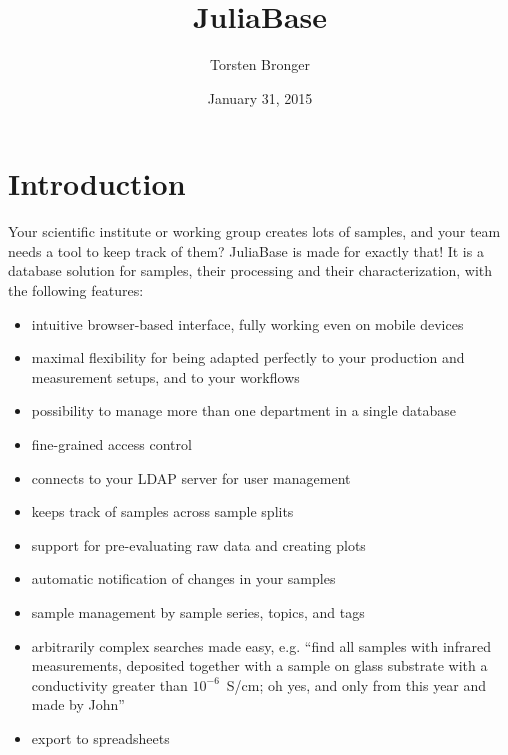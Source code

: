 \documentclass[a4paper,11pt,english]{sphinxmanual}
\title{JuliaBase}
\date{January 31, 2015}
\author{Torsten Bronger}
\begin{document}
\maketitle
\tableofcontents
{}\label{toc::doc}



\chapter{Introduction}
\label{index:introduction}\label{index::doc}\label{index:juliabase}
Your scientific institute or working group creates lots of samples, and your
team needs a tool to keep track of them?  JuliaBase is made for exactly that!
It is a database solution for samples, their processing and their
characterization, with the following features:
\begin{itemize}
\item {} 
intuitive browser-based interface, fully working even on mobile devices

\item {} 
maximal flexibility for being adapted perfectly to your production and
measurement setups, and to your workflows

\item {} 
possibility to manage more than one department in a single database

\item {} 
fine-grained access control

\item {} 
connects to your LDAP server for user management

\item {} 
keeps track of samples across sample splits

\item {} 
support for pre-evaluating raw data and creating plots

\item {} 
automatic notification of changes in your samples

\item {} 
sample management by sample series, topics, and tags

\item {} 
arbitrarily complex searches made easy, e.g. “find all samples with infrared
measurements, deposited together with a sample on glass substrate with a
conductivity greater than \(10^{-6}\) S/cm; oh yes, and only from this year and made
by John”

\item {} 
export to spreadsheets


\end{itemize}
\end{document}
